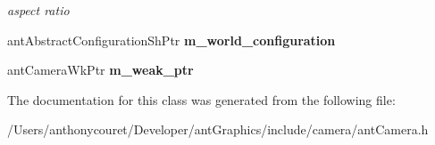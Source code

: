\begin{DoxyCompactItemize}
\begin{DoxyCompactList}\small\item\em aspect ratio \end{DoxyCompactList}\item 
\hypertarget{classant_camera_acf197fa72bad1e615658fe905d29d53a}{ant\+Abstract\+Configuration\+Sh\+Ptr {\bfseries m\+\_\+world\+\_\+configuration}}\label{classant_camera_acf197fa72bad1e615658fe905d29d53a}

\item 
\hypertarget{classant_camera_a6ef6edf0c821f562036dd4294b8e1e57}{ant\+Camera\+Wk\+Ptr {\bfseries m\+\_\+weak\+\_\+ptr}}\label{classant_camera_a6ef6edf0c821f562036dd4294b8e1e57}

\end{DoxyCompactItemize}


The documentation for this class was generated from the following file\+:\begin{DoxyCompactItemize}
\item 
/\+Users/anthonycouret/\+Developer/ant\+Graphics/include/camera/ant\+Camera.\+h\end{DoxyCompactItemize}
